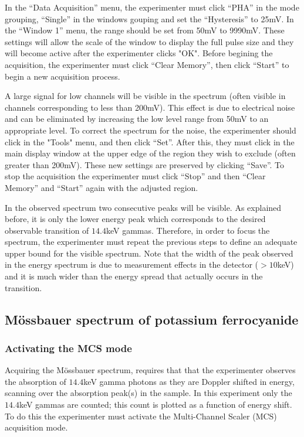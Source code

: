 \documentclass[a4paper, twocolumn]{article}
\begin{document}
In the “Data Acquisition” menu, the experimenter must click “PHA” in the mode grouping, “Single” in the windows gouping and set the “Hysteresis” to 25mV\cite{0}. 
In the “Window 1” menu, the range should be set from 50mV to 9990mV. These settings  will allow the scale of the window to display the full pulse size\cite{0} and they will become active after the experimenter clicks "OK".  Before begining the acquisition, the experimenter must click “Clear Memory”, then click  “Start” to begin a new acquisition process.

A large signal for low channels will be visible in the spectrum (often visible in channels corresponding to less than 200mV). This effect is due to electrical noise and can be eliminated by increasing the low level range from 50mV to an appropriate level\cite{0}.
To correct the spectrum for the noise, the experimenter should click in the "Tools" menu, and then click “Set”. 
After this, they must click in the main display window at the upper edge of the region they wish to exclude (often greater than 200mV). These new settings are preserved by clicking “Save”\cite{0}.
To stop the acquisition the experimenter must click “Stop” and then “Clear Memory” and “Start” again with the adjusted region\cite{0}.

In the observed spectrum two consecutive peaks will be visible. As explained before, it is only the lower energy peak which corresponds to the desired observable transition of $14.4$keV gammas. Therefore, in order to focus the spectrum, the experimenter must repeat the previous steps to define an adequate upper bound for the visible spectrum. Note that the width of the peak observed in the energy spectrum is due to measurement effects in the detector ($>10$keV) and it is much wider than the energy spread that actually occurs in the transition\cite{0}.

\subsection{Mössbauer spectrum of potassium ferrocyanide}
\subsubsection{Activating the MCS mode}
Acquiring the Mössbauer spectrum, requires that that the experimenter observes the absorption of $14.4$keV gamma photons as they are Doppler shifted in energy, scanning over the absorption peak(s) in the sample\cite{0}.
In this experiment only the $14.4$keV gammas are counted; this count is plotted as a function of energy shift. To do this the experimenter must activate the Multi-Channel Scaler (MCS) acquisition mode\cite{0}.
\end{document}
